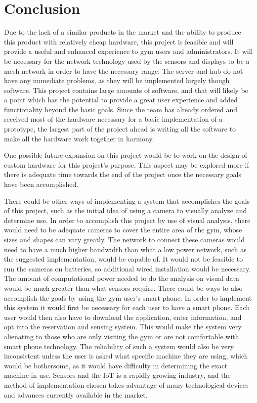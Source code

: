 \documentclass[PPFS.tex]{template/subfiles}
\begin{document}
\section{Conclusion}
Due to the lack of a similar products in the market and the ability to produce this product with relatively cheap hardware, this project is feasible and will provide a useful and enhanced experience to gym users and administrators. It will be necessary for the network technology used by the sensors and displays to be a mesh network in order to have the necessary range. The server and hub do not have any immediate problems, as they will be implemented largely though software. This project contains large amounts of software, and that will likely be a point which has the potential to provide a great user experience and added functionality beyond the basic goals. Since the team has already ordered and received most of the hardware necessary for a basic implementation of a prototype, the largest part of the project ahead is writing all the software to make all the hardware work together in harmony.

One possible future expansion on this project would be to work on the design of custom hardware for this project's purpose. This aspect may be explored more if there is adequate time towards the end of the project once the necessary goals have been accomplished.

There could be other ways of implementing a system that accomplishes the goals of this project, such as the initial idea of using a camera to visually analyze and determine use. In order to accomplish this project by use of visual analysis, there would need to be adequate cameras to cover the entire area of the gym, whose sizes and shapes can vary greatly. The network to connect these cameras would need to have a much higher bandwidth than what a low power network, such as the suggested implementation, would be capable of. It would not be feasible to run the cameras on batteries, so additional wired installation would be necessary. The amount of computational power needed to do the analysis on visual data would be much greater than what sensors require. There could be ways to also accomplish the goals by using the gym user's smart phone. In order to implement this system it would first be necessary for each user to have a smart phone. Each user would then also have to download the application, enter information, and opt into the reservation and sensing system. This would make the system very alienating to those who are only visiting the gym or are not comfortable with smart phone technology. The reliability of such a system would also be very inconsistent unless the user is asked what specific machine they are using, which would be bothersome, as it would have difficulty in determining the exact machine in use. Sensors and the IoT is a rapidly growing industry, and the method of implementation chosen takes advantage of many technological devices and advances currently available in the market.
\end{document}

